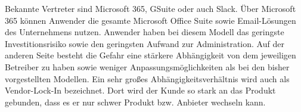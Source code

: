    Bekannte Vertreter sind Microsoft 365, GSuite oder auch Slack.
   Über Microsoft 365 können Anwender die gesamte Microsoft Office Suite sowie Email-Lösungen des Unternehmens nutzen.
   Anwender haben bei diesem Modell das geringste Investitionsrisiko sowie den geringsten Aufwand zur Administration.
   Auf der anderen Seite besteht die Gefahr eine stärkere Abhängigkeit von dem jeweiligen Betreiber zu haben sowie weniger Anpassungsmöglichkeiten als bei den bisher vorgestellten Modellen.
   Ein sehr großes Abhängigkeitsverhältnis wird auch als Vendor-Lock-In bezeichnet. Dort wird der Kunde so stark an das Produkt gebunden, dass es er nur schwer Produkt bzw. Anbieter wechseln kann.



